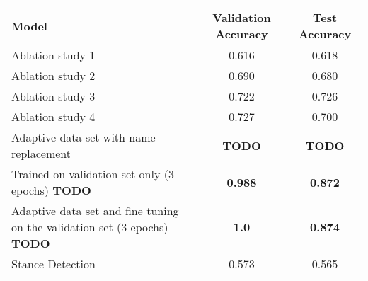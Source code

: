 \begin{tabular}{lcc}  
    \label{table_acuracy}
    
    Model    & Validation Accuracy & Test Accuracy \\
    \hline
    Ablation study 1      & 0.616     & 0.618      \\
    Ablation study 2        & 0.690     & 0.680       \\
    Ablation study 3     & 0.722      & 0.726        \\
    Ablation study 4     & 0.727      & 0.700       \\
    Adaptive data set with name replacement    & \textbf{TODO} & \textbf{TODO} \\
    Trained on validation set only (3 epochs) \textbf{TODO} & \textbf{0.988} & \textbf{0.872} \\
    Adaptive data set and fine tuning on the validation set (3 epochs) \textbf{TODO} & \textbf{1.0} & \textbf{0.874} \\
    Stance Detection      & 0.573     & 0.565      \\
\end{tabular}
